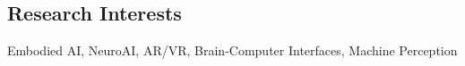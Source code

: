 \subsection*{\textbf{Research Interests}}
Embodied AI, NeuroAI, AR/VR, Brain-Computer Interfaces, Machine Perception
